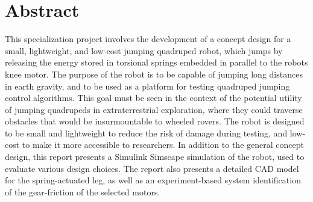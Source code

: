 \section*{Abstract}

This specialization project involves the development of a concept design for a small, lightweight, and low-cost jumping quadruped robot, which jumps by releasing the energy stored in torsional springs embedded in parallel to the robots knee motor. The purpose of the robot is to be capable of jumping long distances in earth gravity, and to be used as a platform for testing quadruped jumping control algorithms. This goal must be seen in the context of the potential utility of jumping quadrupeds in extraterrestrial exploration, where they could traverse obstacles that would be insurmountable to wheeled rovers. The robot is designed to be small and lightweight to reduce the risk of damage during testing, and low-cost to make it more accessible to researchers. In addition to the general concept design, this report presents a Simulink Simscape simulation of the robot, used to evaluate various design choices. The report also presents a detailed CAD model for the spring-actuated leg, as well as an experiment-based system identification of the gear-friction of the selected motors.  